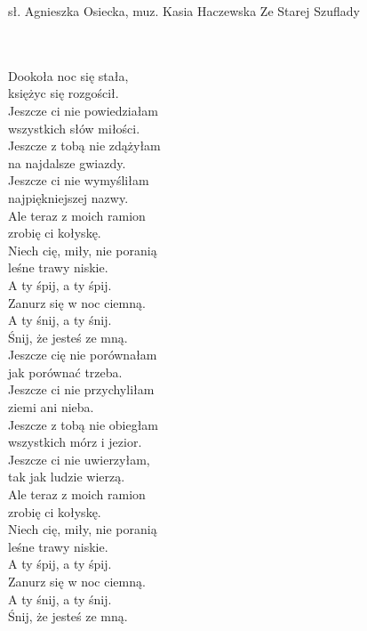 {sł. Agnieszka Osiecka, muz. Kasia Haczewska}
{Ze Starej Szuflady}
\begin{text}
\vin \\
\vin \\
Dookoła noc się stała,\\
księżyc się rozgościł.\\
Jeszcze ci nie powiedziałam\\
wszystkich słów miłości.\\
Jeszcze z tobą nie zdążyłam\\
na najdalsze gwiazdy.\\
Jeszcze ci nie wymyśliłam\\
najpiękniejszej nazwy.\\

\vin Ale teraz z moich ramion\\
\vin zrobię ci kołyskę.\\
\vin Niech cię, miły, nie poranią\\
\vin leśne trawy niskie.\\

\vin \vin A ty śpij, a ty śpij.\\
\vin \vin Zanurz się w noc ciemną.\\
\vin \vin A ty śnij, a ty śnij.\\
\vin \vin Śnij, że jesteś ze mną.\\

Jeszcze cię nie porównałam\\
jak porównać trzeba.\\
Jeszcze ci nie przychyliłam\\
ziemi ani nieba.\\
Jeszcze z tobą nie obiegłam\\
wszystkich mórz i jezior.\\
Jeszcze ci nie uwierzyłam,\\
tak jak ludzie wierzą.\\

\vin Ale teraz z moich ramion\\
\vin zrobię ci kołyskę.\\
\vin Niech cię, miły, nie poranią\\
\vin leśne trawy niskie.\\

\vin \vin A ty śpij, a ty śpij.\\
\vin \vin Zanurz się w noc ciemną.\\
\vin \vin A ty śnij, a ty śnij.\\
\vin \vin Śnij, że jesteś ze mną.\\
\end{text}
